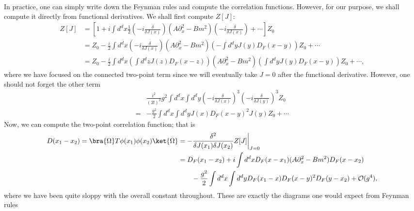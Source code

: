 In practice, one can simply write down the Feynman rules and compute the correlation functions. However, for our purpose, we shall compute it directly from functional derivatives. We shall first compute $Z[J]$:
\begin{equation}
    \begin{aligned}
        Z[J] &= \left[1 + i\int d^dx \frac{1}{2}\left(-i\frac{\delta}{\delta J(x)}\right)(A\partial_x^2 - Bm^2)\left(-i\frac{\delta}{\delta J(x)}\right) + \cdots \right]Z_0\\
        &=Z_0 -\frac{i}{2}\int d^dx\left(-i\frac{\delta}{\delta J(x)}\right)(A\partial_x^2 - Bm^2)\left(-\int d^dy J(y)D_F(x-y)\right)Z_0 + \cdots\\
        &=Z_0- \frac{i}{2}\int d^dx \left(\int d^dz J(z)D_F(x-z)\right)(A\partial_x^2 - Bm^2)\left(\int d^dy J(y)D_F(x-y)\right)Z_0 + \cdots ,
    \end{aligned}
\end{equation}
where we have focused on the connected two-point term since we will eventually take $J=0$ after the functional derivative. However, one should not forget the other term
\begin{equation}
\begin{aligned}
    &\frac{i^2}{(3!)^2}g^2\int d^dx \int d^dy\left(-i\frac{\delta}{\delta J(x)}\right)^3\left(-i\frac{\delta}{\delta J(y)}\right)^3 Z_0 \\
    =&-\frac{g^2}{2}\int d^dx \int d^dy J(x)D_F(x-y)^2 J(y) Z_0 + \cdots
\end{aligned}
\end{equation}
Now, we can compute the two-point correlation function; that is
\begin{equation}
\begin{aligned}
    D(x_1-x_2) =\bra{\Omega}T\phi(x_1)\phi(x_2)\ket{\Omega} &= -\frac{\delta^2}{\delta J(x_1)\delta J(x_2)}Z[J]\bigg|_{J=0} \\
    &=D_F(x_1-x_2) +i\int d^dx D_F(x-x_1)(A\partial_x^2 - Bm^2) D_F(x-x_2)\\
    &\qquad- \frac{g^2}{2}\int d^dx \int d^dy D_F(x_1-x)D_F(x-y)^2D_F(y-x_2) + \mathcal{O}(g^4),
\end{aligned}
\end{equation}
where we have been quite sloppy with the overall constant throughout. These are exactly the diagrams one would expect from Feynman rules
